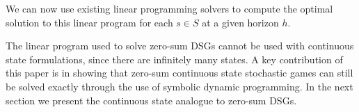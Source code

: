 We can now use existing linear programming solvers to compute the optimal
solution to this linear program for each {\small $s \in S$} at a given horizon $h$.

The linear program used to solve zero-sum DSGs cannot be used with 
continuous state formulations, since there are infinitely many states.  A key contribution 
of this paper is in showing that zero-sum continuous state stochastic games 
can still be solved exactly through the use of symbolic dynamic programming. 
In the next section we present the continuous state analogue to zero-sum DSGs.